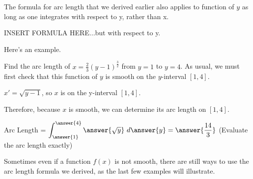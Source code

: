 \documentclass[handout,nooutcomes]{ximera}
\begin{document}
The formula for arc length that we derived earlier also applies to function of $y$ as long as one integrates with respect to y, rather than x.  

INSERT FORMULA HERE...but with respect to y. 


Here's an example.  


\begin{problem}
Find the arc length of $x = \frac{2}{3} (y-1)^{\frac{3}{2}}$ from $y=1$ to $y=4$.  As usual, we must first check that this function of $y$ is smooth on the $y$-interval $[1,4]$.  

$x' = \sqrt{y-1}$, so $x$ is  on the y-interval $[1,4]$.

\begin{problem}
Therefore, because $x$ is smooth, we can determine its arc length on $[1,4]$.

Arc Length = $\displaystyle\int_{\answer{1}}^{\answer{4}} \answer{\sqrt{y}} \ d\answer{y} = \answer{\frac{14}{3}}$ (Evaluate the arc length exactly)

\end{problem}

\end{problem}

Sometimes even if a function $f(x)$ is not smooth, there are still ways to use the arc length formula we derived, as the last few examples will illustrate.

\end{document}
